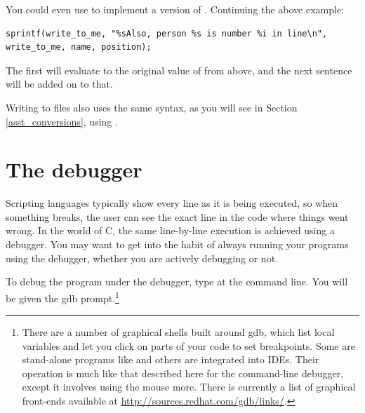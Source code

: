 You could even use  to implement a version of . Continuing the above example:
\begin{lstlisting}
sprintf(write_to_me, "%sAlso, person %s is number %i in line\n", write_to_me, name, position);
\end{lstlisting}
The first  will evaluate to the original value of  from above, and the next
sentence will be added on to that.

Writing to files also uses the same syntax, as you will see in Section \ref{asst_conversions}, using .


\section{The debugger}   \label{debug}
Scripting languages typically show every line as it is being executed,
so when something breaks, the user can see the exact line in the code
where things went wrong. In the world of C, the same line-by-line
execution is achieved using a debugger. You may want to get into the
habit of always running your programs using the debugger, whether you
are actively debugging or not.

To debug the program  under the debugger, type  at the command line.  You will be given the gdb
prompt.\footnote{There are a number of graphical shells built
around gdb, which list local variables and let you click on parts of
your code to set breakpoints. Some are stand-alone programs like  and others are integrated into IDEs. Their operation is much like 
that described here for the command-line debugger, except
it involves using the mouse more. There is currently a list of graphical
front-ends available at \url{http://sources.redhat.com/gdb/links/}.}

